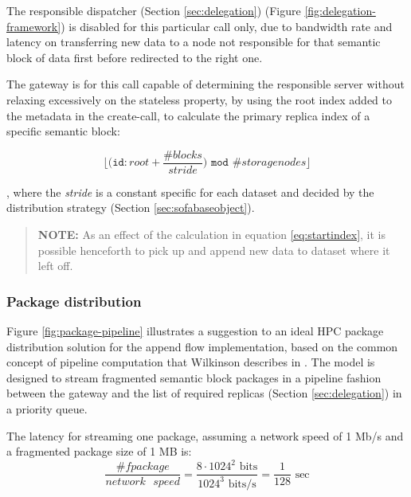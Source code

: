 The responsible dispatcher (Section \ref{sec:delegation}) (Figure \ref{fig:delegation-framework}) is disabled for this particular call only, due to bandwidth rate and latency on transferring new data to a node not responsible for that semantic block of data first before redirected to the right one.

The gateway is for this call capable of determining the responsible server without relaxing excessively on the stateless property, by using the root index added to the metadata in the create-call, to calculate the primary replica index of a specific semantic block:

\vspace*{2mm}
\begin{equation} \label{eq:startindex}
	\Big\lfloor\Big(\texttt{id}:root + \dfrac{\texttt{\#}blocks}{stride}\Big) \texttt{ mod } \texttt{\#}storagenodes\Big\rfloor
\end{equation}

, where the \textit{stride} is a constant specific for each dataset and decided by the distribution strategy (Section \ref{sec:sofabaseobject}).

\begin{quotation}
	{\sffamily\textbf{NOTE:}} As an effect of the calculation in equation \ref{eq:startindex}, it is possible henceforth to pick up and append new data to dataset where it left off.
\end{quotation}

\subsubsection*{Package distribution}
Figure \ref{fig:package-pipeline} illustrates a suggestion to an ideal HPC package distribution solution for the append flow implementation, based on the common concept of pipeline computation that Wilkinson \etal describes in \cite{Wilkinson:1998:PPT:289352}. The model is designed to stream fragmented semantic block packages in a pipeline fashion between the gateway and the list of required replicas (Section \ref{sec:delegation}) in a priority queue.
\newline

The latency for streaming one package, assuming a network speed of 1 Mb/s and a fragmented package size of 1 MB is:
\begin{equation}
	\dfrac{\texttt{\#}fpackage}{network\text{ }speed} = \dfrac{8\cdot 1024^2 \text{ bits}}{1024^3 \text{ bits/s}} = \dfrac{1}{128} \text{ sec}
\end{equation}

